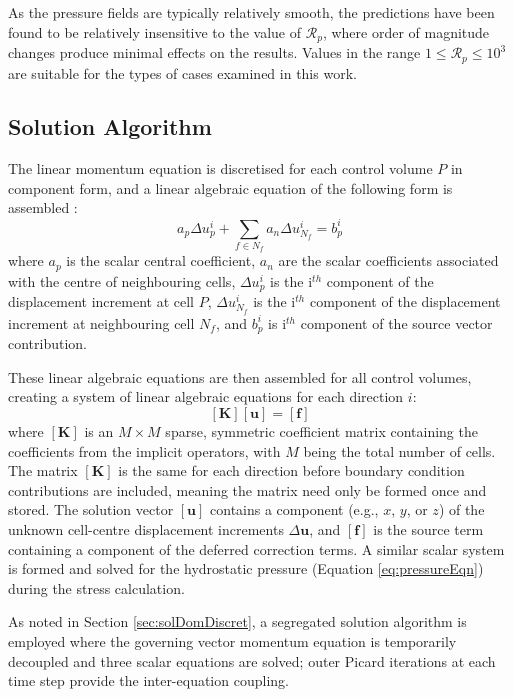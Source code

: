 \documentclass[sn-mathphys,Numbered]{sn-jnl}%
\newcommand{\bb}{\boldsymbol}
\begin{document}
As the pressure fields are typically relatively smooth, the predictions have been found to be relatively insensitive to the value of $\mathcal{R}_p$, where order of magnitude changes produce minimal effects on the results.
Values in the range $1 \leq \mathcal{R}_p \leq 10^3$ are suitable for the types of cases examined in this work.


\subsection{Solution Algorithm}
The linear momentum equation is discretised for each control volume $P$ in component form, and a linear algebraic equation of the following form is assembled \cite{jasak_application_2000}:
\begin{equation}
a_p \Delta {u}_p^i + \sum_{f \in N_f}  a_n \Delta {u}_{N_f}^i = {b}_p^i
\end{equation}
where $a_{p}$ is the scalar central coefficient, $a_{n}$ are the scalar coefficients associated with the centre of neighbouring cells, $\Delta {u}_p^i$ is the i$^{th}$ component of the displacement increment at cell $P$, $\Delta {u}_{N_f}^i$ is the i$^{th}$ component of the displacement increment at neighbouring cell $N_f$, and ${b}_p^i$ is i$^{th}$ component of the source vector contribution.

These linear algebraic equations are then assembled for all control volumes, creating a system of linear algebraic equations for each direction $i$:
\begin{equation}
    \left[\bb{K}\right]
    \left[\bb{u}\right] =
    \left[ \bb{f} \right]
\end{equation}
where $\left[\bb{K}\right]$ is an $M \times M$ sparse, symmetric coefficient matrix containing the coefficients from the implicit operators, with $M$ being the total number of cells.
The matrix $\left[\bb{K}\right]$ is the same for each direction before boundary condition contributions are included, meaning the matrix need only be formed once and stored.
The solution vector $\left[\bb{u}\right]$ contains a component (e.g., $x$, $y$, or $z$) of the unknown cell-centre displacement increments $\Delta\bb{ u}$, and $\left[\bb{f}\right]$ is the source term containing a component of the deferred correction terms.
A similar scalar system is formed and solved for the hydrostatic pressure (Equation \ref{eq:pressureEqn}) during the stress calculation.

As noted in Section \ref{sec:solDomDiscret}, a segregated solution algorithm is employed where the governing vector momentum equation is temporarily decoupled and three scalar equations are solved; outer Picard iterations at each time step provide the inter-equation coupling.
\end{document}
